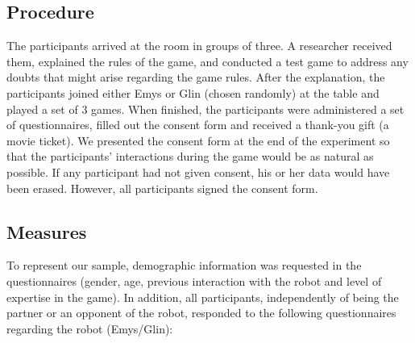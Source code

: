 \subsection{Procedure}
The participants arrived at the room in groups of three. A researcher received them, explained the rules of the game, and conducted a test game to address any doubts that might arise regarding the game rules. After the explanation, the participants joined either Emys or Glin (chosen randomly) at the table and played a set of 3 games. When finished, the participants were administered a set of questionnaires, filled out the consent form and received a thank-you gift (a movie ticket). We presented the consent form at the end of the experiment so that the participants' interactions during the game would be as natural as possible. If any participant had not given consent, his or her data would have been erased. However, all participants signed the consent form.

\subsection{Measures}
To represent our sample, demographic information was requested in the questionnaires (gender, age, previous interaction with the robot and level of expertise in the game). In addition, all participants, independently of being the partner or an opponent of the robot, responded to the following questionnaires regarding the robot (Emys/Glin):

